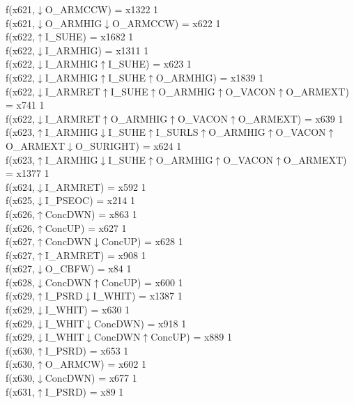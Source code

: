 f(x621,$\downarrow$O\_ARMCCW) = x1322 {1} \\
f(x621,$\downarrow$O\_ARMHIG$\downarrow$O\_ARMCCW) = x622 {1} \\
f(x622,$\uparrow$I\_SUHE) = x1682 {1} \\
f(x622,$\downarrow$I\_ARMHIG) = x1311 {1} \\
f(x622,$\downarrow$I\_ARMHIG$\uparrow$I\_SUHE) = x623 {1} \\
f(x622,$\downarrow$I\_ARMHIG$\uparrow$I\_SUHE$\uparrow$O\_ARMHIG) = x1839 {1} \\
f(x622,$\downarrow$I\_ARMRET$\uparrow$I\_SUHE$\uparrow$O\_ARMHIG$\uparrow$O\_VACON$\uparrow$O\_ARMEXT) = x741 {1} \\
f(x622,$\downarrow$I\_ARMRET$\uparrow$O\_ARMHIG$\uparrow$O\_VACON$\uparrow$O\_ARMEXT) = x639 {1} \\
f(x623,$\uparrow$I\_ARMHIG$\downarrow$I\_SUHE$\uparrow$I\_SURLS$\uparrow$O\_ARMHIG$\uparrow$O\_VACON$\uparrow$O\_ARMEXT$\downarrow$O\_SURIGHT) = x624 {1} \\
f(x623,$\uparrow$I\_ARMHIG$\downarrow$I\_SUHE$\uparrow$O\_ARMHIG$\uparrow$O\_VACON$\uparrow$O\_ARMEXT) = x1377 {1} \\
f(x624,$\downarrow$I\_ARMRET) = x592 {1} \\
f(x625,$\downarrow$I\_PSEOC) = x214 {1} \\
f(x626,$\uparrow$ConcDWN) = x863 {1} \\
f(x626,$\uparrow$ConcUP) = x627 {1} \\
f(x627,$\uparrow$ConcDWN$\downarrow$ConcUP) = x628 {1} \\
f(x627,$\uparrow$I\_ARMRET) = x908 {1} \\
f(x627,$\downarrow$O\_CBFW) = x84 {1} \\
f(x628,$\downarrow$ConcDWN$\uparrow$ConcUP) = x600 {1} \\
f(x629,$\uparrow$I\_PSRD$\downarrow$I\_WHIT) = x1387 {1} \\
f(x629,$\downarrow$I\_WHIT) = x630 {1} \\
f(x629,$\downarrow$I\_WHIT$\downarrow$ConcDWN) = x918 {1} \\
f(x629,$\downarrow$I\_WHIT$\downarrow$ConcDWN$\uparrow$ConcUP) = x889 {1} \\
f(x630,$\uparrow$I\_PSRD) = x653 {1} \\
f(x630,$\uparrow$O\_ARMCW) = x602 {1} \\
f(x630,$\downarrow$ConcDWN) = x677 {1} \\
f(x631,$\uparrow$I\_PSRD) = x89 {1} \\
